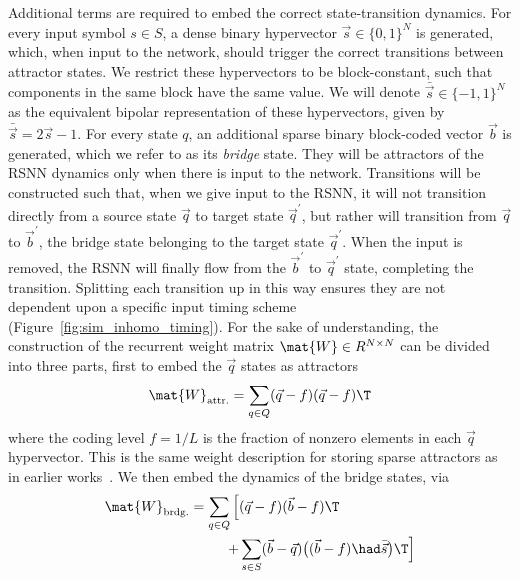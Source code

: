 Additional terms are required to embed the correct state-transition dynamics. For every input symbol $s \in S$, a dense binary hypervector $\vec{s} \in \{0, 1\}^N$ is generated, which, when input to the network, should trigger the correct transitions between attractor states. We restrict these hypervectors to be block-constant, such that components in the same block have the same value.
We will denote $\bar{\vec{s}} \in \{-1,1\}^N$ as the equivalent bipolar representation of these hypervectors, given by $\bar{\vec{s}} = 2 \vec{s} -1$. For every state $q$, an additional sparse binary block-coded vector $\vec{b}$ is generated, which we refer to as its \textit{bridge} state. They will be attractors of the RSNN dynamics only when there is input to the network. Transitions will be constructed such that, when we give input to the RSNN, it will not transition directly from a source state $\vec{q}$ to target state $\vec{q}^\prime$, but rather will transition from $\vec{q}$ to $\vec{b}^\prime$, the bridge state belonging to the target state $\vec{q}^\prime$. When the input is removed, the RSNN will finally flow from the $\vec{b}^\prime$ to $\vec{q}^\prime$ state, completing the transition. Splitting each transition up in this way ensures they are not dependent upon a specific input timing scheme \mbox{(Figure \ref{fig:sim_inhomo_timing})}.
For the sake of understanding, the construction of the recurrent weight matrix $\mat{W} \in R^{N \times N}$ can be divided into three parts, first to embed the $\vec{q}$ states as attractors
\begin{equation}
\begin{split}
    \mat{W}_{\text{attr.}}  = \sum_{q \in Q}  (\vec{q}-f)(\vec{q}-f)\T
\end{split}
\label{eqn:W_attr}
\end{equation}
where the coding level $f = 1/L$ is the fraction of nonzero elements in each $\vec{q}$ hypervector. This is the same weight description for storing sparse attractors as in earlier works~\cite{tsodyks_enhanced_1988, amari_characteristics_1989}. We then embed the dynamics of the bridge states, via
\begin{equation}
\begin{split}
    \mat{W}_{\text{brdg.}}  = \sum_{q \in Q}  \Big[ & (\vec{q}-f)(\vec{b}-f)\T \\
     + & \sum_{s \in S} (\vec{b} - \vec{q}) \big( (\vec{b} -f) \had \bar{\vec{s}} \big)\T \Big]
\end{split}
\label{eqn:W_bridge}
\end{equation}
